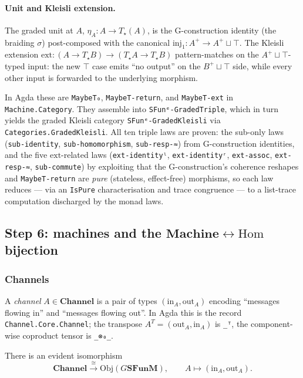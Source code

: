 \documentclass[11pt]{article}
\newcommand{\SFunM}{\mathbf{SFunM}}
\newcommand{\Obj}{\mathrm{Obj}}
\newcommand{\Channel}{\mathbf{Channel}}
\newcommand{\Machine}{\mathbf{Machine}}
\begin{document}
\paragraph{Unit and Kleisli extension.}
The graded unit at $A$,
$\eta_A : A \to T_\star(A)$, is the G-construction identity (the
braiding $\sigma$) post-composed with the canonical
$\mathrm{inj}_1 : A^+ \to A^+ \sqcup \top$.  The Kleisli extension
$\mathrm{ext} : (A \to T_\star B) \to (T_\star A \to T_\star B)$
pattern-matches on the $A^+ \sqcup \top$-typed input: the new $\top$
case emits ``no output'' on the $B^+ \sqcup \top$ side, while every
other input is forwarded to the underlying morphism.

In Agda these are \texttt{MaybeT₀}, \texttt{MaybeT-return}, and
\texttt{MaybeT-ext} in \texttt{Machine.Category}.  They assemble
into \texttt{SFunᵉ-GradedTriple}, which in turn yields the graded
Kleisli category \texttt{SFunᵉ-GradedKleisli} via
\texttt{Categories.GradedKleisli}.  All ten triple laws are proven:
the sub-only laws (\texttt{sub-identity}, \texttt{sub-homomorphism},
\texttt{sub-resp-≈}) from G-construction identities, and the five
$\mathrm{ext}$-related laws (\texttt{ext-identityˡ},
\texttt{ext-identityʳ}, \texttt{ext-assoc}, \texttt{ext-resp-≈},
\texttt{sub-commute}) by exploiting that the G-construction's
coherence reshapes and \texttt{MaybeT-return} are \emph{pure}
(stateless, effect-free) morphisms, so each law reduces --- via an
\texttt{IsPure} characterisation and trace congruence --- to a
list-trace computation discharged by the monad laws.

\subsection{Step 6: machines and the $\Machine \leftrightarrow \mathrm{Hom}$ bijection}

\subsubsection{Channels}

A \emph{channel} $A \in \Channel$ is a pair of types
$(\mathrm{in}_A, \mathrm{out}_A)$ encoding ``messages flowing in''
and ``messages flowing out''.  In Agda this is the record
\texttt{Channel.Core.Channel}; the transpose
$A^T = (\mathrm{out}_A, \mathrm{in}_A)$ is \texttt{\_ᵀ}, the
component-wise coproduct tensor is \texttt{\_⊗₀\_}.

There is an evident isomorphism
\[
  \Channel \xrightarrow{\cong} \Obj(G\SFunM),
  \qquad
  A \mapsto (\mathrm{in}_A, \mathrm{out}_A).
\]
\end{document}
